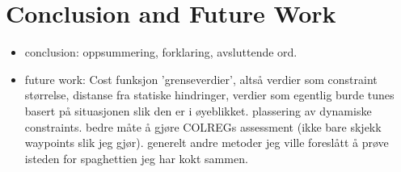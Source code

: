 \section{Conclusion and Future Work}
\begin{itemize}
    \item conclusion:
    \subitem oppsummering, forklaring, avsluttende ord.
    \item future work:
    \subitem Cost funksjon
    \subitem 'grenseverdier', altså verdier som constraint størrelse, distanse fra statiske hindringer, verdier som egentlig burde tunes basert på situasjonen slik den er i øyeblikket.
    \subitem plassering av dynamiske constraints.
    \subitem bedre måte å gjøre COLREGs assessment (ikke bare skjekk waypoints slik jeg gjør).
    \subitem generelt andre metoder jeg ville foreslått å prøve isteden for spaghettien jeg har kokt sammen.
\end{itemize}

\newpage